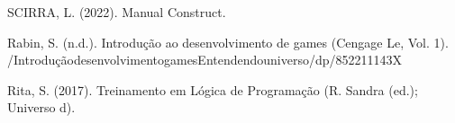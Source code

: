 \documentclass[letterpaper,10pt,brazil]{sphinxmanual}
\begin{document}
\sphinxAtStartPar
SCIRRA, L. (2022). Manual Construct.

\sphinxAtStartPar
Rabin, S. (n.d.). Introdução ao desenvolvimento de games (Cengage Le, Vol. 1).
/Introdução\sphinxhyphen{}desenvolvimento\sphinxhyphen{}games\sphinxhyphen{}Entendendo\sphinxhyphen{}universo/dp/852211143X

\sphinxAtStartPar
Rita, S. (2017). Treinamento em Lógica de Programação (R. Sandra (ed.); Universo d).



\renewcommand{\indexname}{Índice}
\printindex
\end{document}

